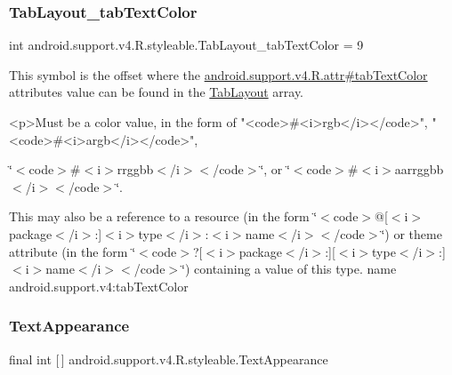 \subsubsection{\texorpdfstring{Tab\+Layout\+\_\+tab\+Text\+Color}{TabLayout\_tabTextColor}}
{\footnotesize\ttfamily int android.\+support.\+v4.\+R.\+styleable.\+Tab\+Layout\+\_\+tab\+Text\+Color = 9\hspace{0.3cm}{\ttfamily [static]}}

This symbol is the offset where the \hyperlink{classandroid_1_1support_1_1v4_1_1R_1_1attr_af9f7d1989e331de9a1ba5e3e353335ad}{android.\+support.\+v4.\+R.\+attr\#tab\+Text\+Color} attribute\textquotesingle{}s value can be found in the \hyperlink{classandroid_1_1support_1_1v4_1_1R_1_1styleable_a48e866d7121b40ef0bb3d467759606a9}{Tab\+Layout} array.

\begin{DoxyVerb}      <p>Must be a color value, in the form of "<code>#<i>rgb</i></code>", "<code>#<i>argb</i></code>",
\end{DoxyVerb}
 \char`\"{}$<$code$>$\#$<$i$>$rrggbb$<$/i$>$$<$/code$>$\char`\"{}, or \char`\"{}$<$code$>$\#$<$i$>$aarrggbb$<$/i$>$$<$/code$>$\char`\"{}. 

This may also be a reference to a resource (in the form \char`\"{}$<$code$>$@\mbox{[}$<$i$>$package$<$/i$>$\+:\mbox{]}$<$i$>$type$<$/i$>$\+:$<$i$>$name$<$/i$>$$<$/code$>$\char`\"{}) or theme attribute (in the form \char`\"{}$<$code$>$?\mbox{[}$<$i$>$package$<$/i$>$\+:\mbox{]}\mbox{[}$<$i$>$type$<$/i$>$\+:\mbox{]}$<$i$>$name$<$/i$>$$<$/code$>$\char`\"{}) containing a value of this type.  name android.\+support.\+v4\+:tab\+Text\+Color \mbox{\label{classandroid_1_1support_1_1v4_1_1R_1_1styleable_a81c402d7a6e327c354a1cf72b21fc4f5}} 
\subsubsection{\texorpdfstring{Text\+Appearance}{TextAppearance}}
{\footnotesize\ttfamily final int \mbox{[}$\,$\mbox{]} android.\+support.\+v4.\+R.\+styleable.\+Text\+Appearance\hspace{0.3cm}{\ttfamily [static]}}

